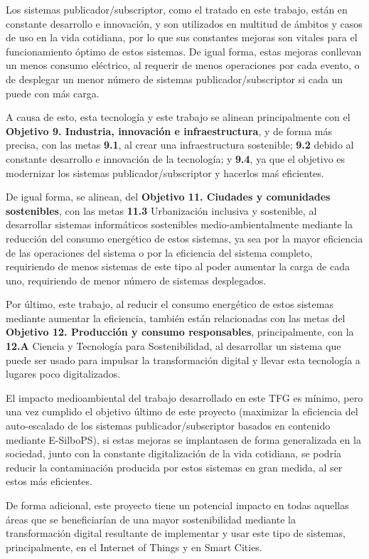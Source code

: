 Los sistemas publicador/subscriptor, como el tratado en este trabajo, están 
en constante desarrollo e innovación, y son utilizados en multitud de ámbitos y
casos de uso en la vida cotidiana, por lo que sus constantes mejoras son vitales
para el funcionamiento óptimo de estos sistemas. De igual forma, estas mejoras 
conllevan un menos consumo eléctrico, al requerir de menos operaciones por cada
evento, o de desplegar un menor número de sistemas publicador/subscriptor si cada 
un puede con más carga.

A causa de esto, esta tecnología y este trabajo se alinean principalmente con el 
\textbf{Objetivo 9. Industria, innovación e infraestructura}, y de forma más 
precisa, con las metas \textbf{9.1}, al crear una infraestructura sostenible; 
\textbf{9.2} debido al constante desarrollo e innovación de la tecnología; y 
\textbf{9.4}, ya que el objetivo es modernizar los sistemas publicador/subscriptor 
y hacerlos maś eficientes.

De igual forma, se alinean, del \textbf{Objetivo 11. Ciudades y 
comunidades sostenibles}, con las metas \textbf{11.3} Urbanización inclusiva y 
sostenible, al desarrollar sistemas informáticos sostenibles 
medio-ambientalmente mediante la reducción del consumo energético de estos 
sistemas, ya sea por la mayor eficiencia de las operaciones del sistema o por
la eficiencia del sistema completo, requiriendo de menos sistemas de este tipo
al poder aumentar la carga de cada uno, requiriendo de menor número de sistemas 
desplegados.

Por último, este trabajo, al reducir el consumo energético de estos sistemas 
mediante aumentar la eficiencia, también están relacionadas con las metas del
\textbf{Objetivo 12. Producción y consumo responsables}, principalmente, con la
\textbf{12.A} Ciencia y Tecnología para Sostenibilidad, al desarrollar un sistema
que puede ser usado para impulsar la transformación digital y llevar esta 
tecnología a lugares poco digitalizados.

El impacto medioambiental del trabajo desarrollado en este TFG es mínimo, pero
una vez cumplido el objetivo último de este proyecto (maximizar la eficiencia 
del auto-escalado de los sistemas publicador/subscriptor basados en contenido
mediante E-SilboPS), si estas mejoras se implantasen de forma generalizada en 
la sociedad, junto con la constante digitalización de la vida cotidiana, 
se podría reducir la contaminación producida por estos sistemas en gran medida, 
al ser estos más eficientes.

De forma adicional, este proyecto tiene un potencial impacto en todas aquellas
áreas que se beneficiarían de una mayor sostenibilidad mediante la 
transformación digital resultante de implementar y usar este tipo de sistemas,
principalmente, en el Internet of Things y en Smart Cities.